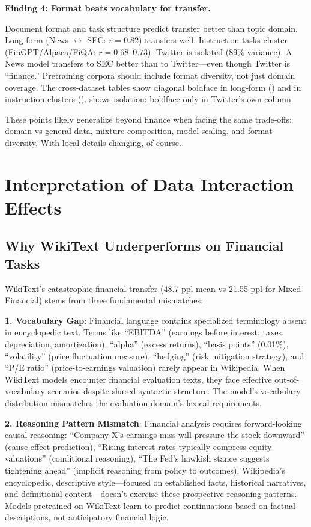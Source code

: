 \textbf{Finding 4: Format beats vocabulary for transfer.}

Document format and task structure predict transfer better than topic domain. Long‑form (News $\leftrightarrow$ SEC: $r = 0.82$) transfers well. Instruction tasks cluster (FinGPT/Alpaca/FiQA: $r = 0.68$–$0.73$). Twitter is isolated (89\% variance). A News model transfers to SEC better than to Twitter—even though Twitter is “finance.” Pretraining corpora should include format diversity, not just domain coverage. The cross‑dataset tables show diagonal boldface in long‑form () and in instruction clusters ().  shows isolation: boldface only in Twitter’s own column.

These points likely generalize beyond finance when facing the same trade‑offs: domain vs general data, mixture composition, model scaling, and format diversity. With local details changing, of course.

\section{Interpretation of Data Interaction Effects}

\subsection{Why WikiText Underperforms on Financial Tasks}

WikiText's catastrophic financial transfer (48.7 ppl mean vs 21.55 ppl for Mixed Financial) stems from three fundamental mismatches:

\textbf{1. Vocabulary Gap}: Financial language contains specialized terminology absent in encyclopedic text. Terms like ``EBITDA'' (earnings before interest, taxes, depreciation, amortization), ``alpha'' (excess returns), ``basis points'' (0.01\%), ``volatility'' (price fluctuation measure), ``hedging'' (risk mitigation strategy), and ``P/E ratio'' (price-to-earnings valuation) rarely appear in Wikipedia. When WikiText models encounter financial evaluation texts, they face effective out-of-vocabulary scenarios despite shared syntactic structure. The model's vocabulary distribution mismatches the evaluation domain's lexical requirements.

\textbf{2. Reasoning Pattern Mismatch}: Financial analysis requires forward-looking causal reasoning: ``Company X's earnings miss will pressure the stock downward'' (cause-effect prediction), ``Rising interest rates typically compress equity valuations'' (conditional reasoning), ``The Fed's hawkish stance suggests tightening ahead'' (implicit reasoning from policy to outcomes). Wikipedia's encyclopedic, descriptive style—focused on established facts, historical narratives, and definitional content—doesn't exercise these prospective reasoning patterns. Models pretrained on WikiText learn to predict continuations based on factual descriptions, not anticipatory financial logic.

